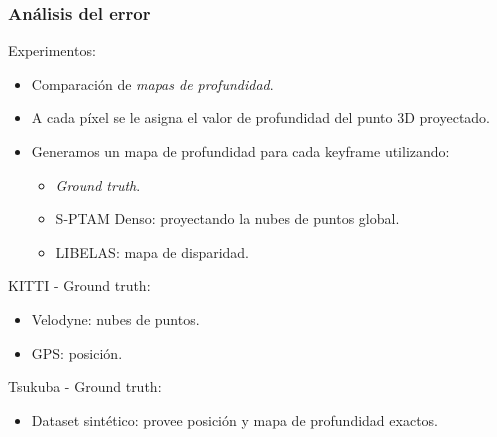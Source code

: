 \documentclass[compress]{beamer}
\begin{document}
\begin{frame}
	\frametitle{Análisis del error}
	
	\vspace{-1em}
	\pause{}
	Experimentos:
	\begin{itemize}
		\item Comparación de \emph{mapas de profundidad}.
		\item A cada píxel se le asigna el valor de profundidad del punto 3D proyectado.
		\item Generamos un mapa de profundidad para cada keyframe utilizando:
		\begin{itemize}
			\item \emph{Ground truth}.
			\item S-PTAM Denso: proyectando la nubes de puntos global.
			\item LIBELAS: mapa de disparidad.
		\end{itemize}
	\end{itemize}

	\vspace{1em}
	\pause{}	
	KITTI - Ground truth:
	\begin{itemize}
		\item Velodyne: nubes de puntos.
		\item GPS: posición.
	\end{itemize}
	
	\vspace{1em}
	Tsukuba - Ground truth:
	\begin{itemize}
		\item Dataset sintético: provee posición y mapa de profundidad exactos.
	\end{itemize}
	
\end{frame}
\end{document}
